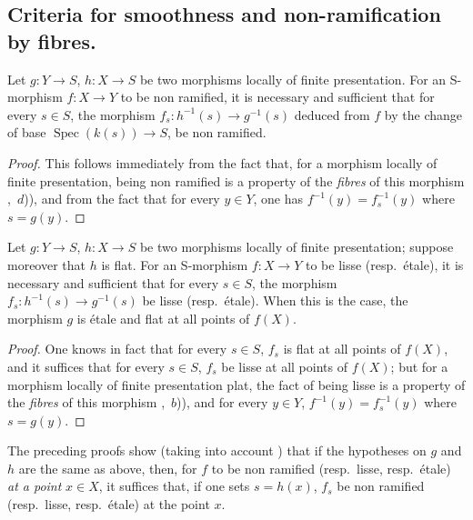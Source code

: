 \subsection{Criteria for smoothness and non-ramification by fibres.}
\label{subsection:IV.17.8}


\begin{proposition}[17.8.1]
\label{IV.17.8.1}
Let $g:Y\to S$, $h:X\to S$ be two morphisms locally of finite presentation.
For an S-morphism $f:X\to Y$ to be non ramified, it is necessary and sufficient that for every $s\in S$, the morphism $f_s:h^{-1}(s)\to g^{-1}(s)$ deduced from $f$ by the change of base $\operatorname{Spec}(k(s))\to S$, be non ramified.
\end{proposition}

\begin{proof}
This follows immediately from the fact that, for a morphism locally of finite presentation, being non ramified is a property of the \emph{fibres} of this morphism ,~$d$)), and from the fact that for every $y\in Y$, one has $f^{-1}(y)=f_s^{-1}(y)$ where $s=g(y)$.
\end{proof}

\begin{proposition}[17.8.2]
\label{IV.17.8.2}
Let $g:Y\to S$, $h:X\to S$ be two morphisms locally of finite presentation; suppose moreover that $h$ is flat.
For an S-morphism $f:X\to Y$ to be lisse (resp.\ \'etale), it is necessary and sufficient that for every $s\in S$, the morphism $f_s:h^{-1}(s)\to g^{-1}(s)$ be lisse (resp.\ \'etale).
When this is the case, the morphism $g$ is \'etale and flat at all points of $f(X)$.
\end{proposition}

\begin{proof}
One knows in fact  that for every $s\in S$, $f_s$ is flat at all points of $f(X)$, and it suffices that for every $s\in S$, $f_s$ be lisse at all points of $f(X)$; but for a morphism locally of finite presentation plat, the fact of being lisse is a property of the \emph{fibres} of this morphism ,~$b$)), and for every $y\in Y$, $f^{-1}(y)=f_s^{-1}(y)$ where $s=g(y)$.
\end{proof}

\begin{remark}[17.8.3]
\label{IV.17.8.3}
The preceding proofs show (taking into account ) that if the hypotheses on $g$ and $h$ are the same as above, then, for $f$ to be non ramified (resp.\ lisse, resp.\ \'etale) \emph{at a point} $x\in X$, it suffices that, if one sets $s=h(x)$, $f_s$ be non ramified (resp.\ lisse, resp.\ \'etale) at the point $x$.
\end{remark}



